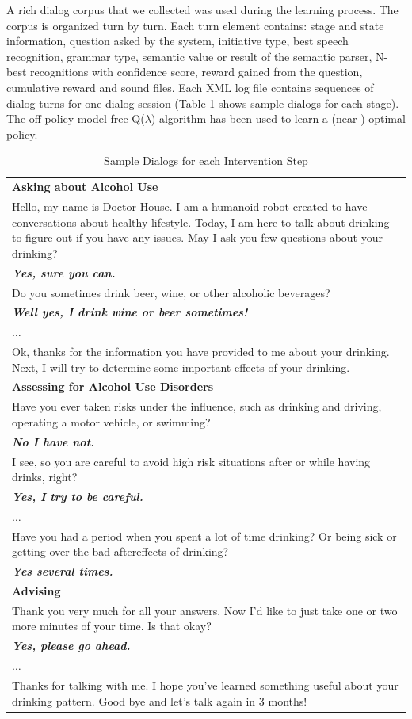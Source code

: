 \documentclass[letterpaper]{article}
\begin{document}
\begin{inparaenum}[1)]
A rich dialog corpus that we collected was used during the learning process. The corpus is organized turn by 
turn. Each turn element contains: stage and state information, question asked by the system,  
initiative type,  best speech recognition, grammar type, semantic value or result of the semantic 
parser, N-best recognitions with confidence score, reward gained from the question, cumulative 
reward and sound files. Each XML log file contains sequences of dialog turns for one dialog 
session (Table \ref{sampleDialog} shows  sample dialogs for each stage). The off-policy model free 
Q($\lambda$) algorithm has been used to learn a (near-) optimal policy.

\begin{table}[!h]
\caption{Sample Dialogs for each Intervention Step}
\label{sampleDialog}
\begin{tabular}{ p{80mm}  } \hline
    \textbf{Asking about Alcohol Use} \\
    Hello, my name is Doctor House. I am a humanoid robot created to have conversations about 
healthy lifestyle. Today, I am here to talk about drinking to figure out if you have any issues.  
May I ask you few questions about your drinking? \\
\bf{\em{Yes, sure you can.}}\\
Do you sometimes drink beer, wine, or other alcoholic beverages?\\
\bf{\em{Well yes, I drink wine or beer sometimes!}} \\
$\ldots$\\
Ok, thanks for the information you have provided to me about your drinking. Next, I will try to 
determine some important effects of your drinking. \\
    \hline
    \textbf{Assessing for Alcohol Use Disorders} \\
    Have you ever taken risks under the influence, such as drinking and driving, operating a motor 
vehicle, or swimming?\\
\bf{\em{No I have not.}} \\
I see, so you are careful to avoid high risk situations after or while having drinks, right?\\
\bf{\em{Yes, I try to be careful.}} \\
$\ldots$\\
Have you had a period when you spent a lot of time drinking? Or being sick or getting over the bad 
aftereffects of drinking? \\
\bf{\em{Yes several times.}} \\
    \hline
    \textbf{Advising} \\
     Thank you very much for all your answers. Now I'd like to just take one or two more minutes of 
your time. Is that okay? \\
\bf{\em{Yes, please go ahead.}}\\
$\ldots$\\
Thanks for talking with me. I hope you've learned something useful about your drinking pattern.  
Good bye and let's talk again in 3 months! \\
    \hline
\end{tabular}
\end{table}



\end{inparaenum}
\end{document}
